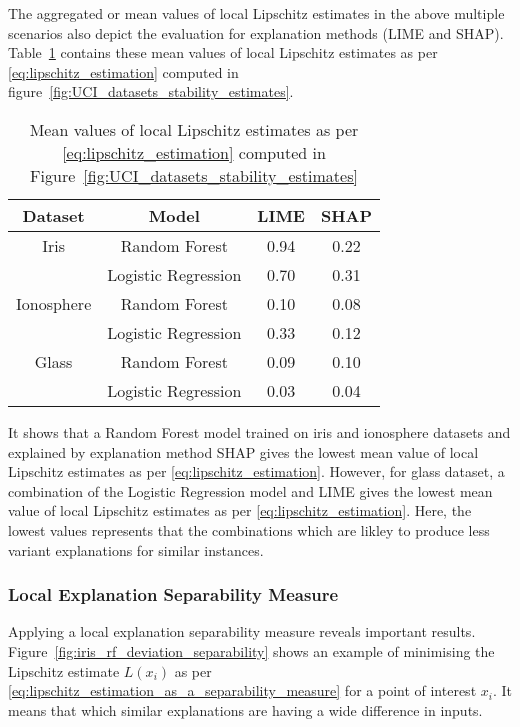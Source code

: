 \documentclass[english]{tktltiki2}
\theoremstyle{definition}
\theoremstyle{remark}
\begin{document}
The aggregated or mean values of local Lipschitz estimates in the above multiple scenarios also depict the evaluation for explanation methods (LIME and SHAP). Table~\ref{table:lipschitz_estimation_aggregated_datasets_UCI} contains these mean values of local Lipschitz estimates as per \eqref{eq:lipschitz_estimation} computed in figure~\ref{fig:UCI_datasets_stability_estimates}.

\begin{table}[H]
	\caption{Mean values of local Lipschitz estimates as per \eqref{eq:lipschitz_estimation} computed in Figure~\ref{fig:UCI_datasets_stability_estimates}}
	\label{table:lipschitz_estimation_aggregated_datasets_UCI}
	\begin{center}
		\begin{tabular}{|c|c|c|c|}
			\hline
			\textbf{Dataset} & \textbf{Model} & \textbf{LIME} & \textbf{SHAP} \\ \hline
			
			Iris & Random Forest & 0.94 & 0.22  \\ \hline
			& Logistic Regression & 0.70 & 0.31 \\ \hline
			
			Ionosphere & Random Forest & 0.10 & 0.08 \\ \hline
			& Logistic Regression & 0.33 & 0.12 \\ \hline
			
			Glass & Random Forest & 0.09 & 0.10 \\ \hline
			& Logistic Regression & 0.03 & 0.04 \\ \hline
			
		\end{tabular}
	\end{center}
\end{table}

It shows that a Random Forest model trained on iris and ionosphere datasets and explained by explanation method SHAP gives the lowest mean value of local Lipschitz estimates as per \eqref{eq:lipschitz_estimation}. However, for glass dataset, a combination of the Logistic Regression model and LIME gives the lowest mean value of local Lipschitz estimates as per \eqref{eq:lipschitz_estimation}. Here, the lowest values represents that the combinations which are likley to produce less variant explanations for similar instances.

\subsubsection*{Local Explanation Separability Measure}
Applying a local explanation separability measure reveals important results. Figure~\ref{fig:iris_rf_deviation_separability} shows an example of minimising the Lipschitz estimate $L(x_i)$ as per \eqref{eq:lipschitz_estimation_as_a_separability_measure} for a point of interest $x_i$. It means that which similar explanations are having a wide difference in inputs.
\end{document}
